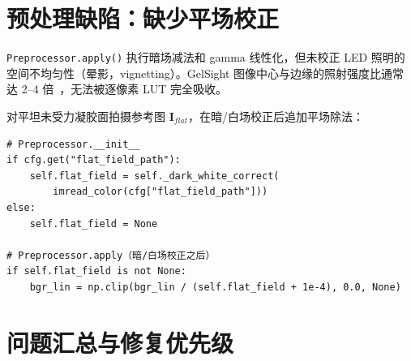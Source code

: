 \section{预处理缺陷：缺少平场校正}
\label{sec:preproc}

\texttt{Preprocessor.apply()} 执行暗场减法和 gamma 线性化，但未校正 LED 照明的
空间不均匀性（晕影，vignetting）。GelSight 图像中心与边缘的照射强度比通常达
2--4 倍~\cite{yuan2017gelsight,dong2017improved}，无法被逐像素 LUT 完全吸收。

\begin{fixbox}
对平坦未受力凝胶面拍摄参考图 $\mathbf{I}_{flat}$，在暗/白场校正后追加平场除法：

\begin{lstlisting}
# Preprocessor.__init__
if cfg.get("flat_field_path"):
    self.flat_field = self._dark_white_correct(
        imread_color(cfg["flat_field_path"]))
else:
    self.flat_field = None

# Preprocessor.apply（暗/白场校正之后）
if self.flat_field is not None:
    bgr_lin = np.clip(bgr_lin / (self.flat_field + 1e-4), 0.0, None)
\end{lstlisting}
\end{fixbox}

\section{问题汇总与修复优先级}
\label{sec:summary}


